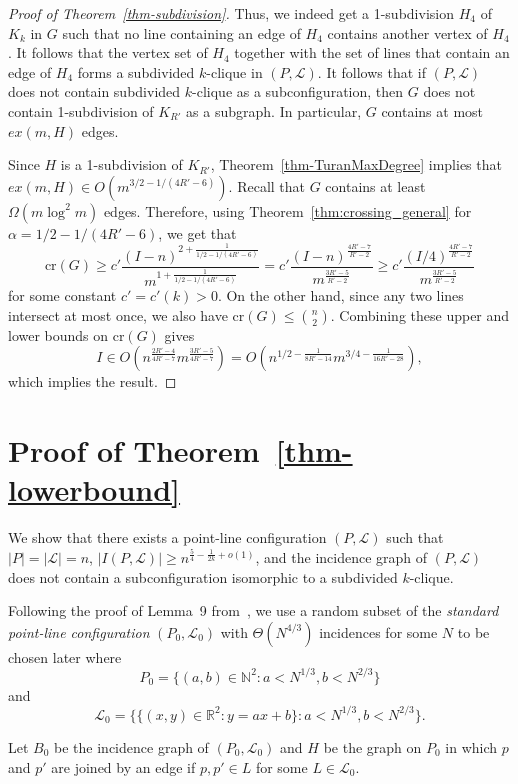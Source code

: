\documentclass{article}
\begin{document}
\begin{proof}[Proof of Theorem~\ref{thm-subdivision}]
Thus, we indeed get a 1-subdivision $H_4$ of $K_k$ in $G$ such that no line containing an edge of $H_4$ contains another vertex of $H_4$. 
It follows that the vertex set of $H_4$ together with the set of lines that contain an edge of $H_4$ forms a subdivided $k$-clique in $(P,\mathcal{L})$.
It follows that if $(P,\mathcal{L})$ does not contain subdivided $k$-clique as a subconfiguration, then $G$ does not contain 1-subdivision of $K_{R'}$ as a subgraph.
In particular, $G$ contains at most $ex(m,H)$ edges.

Since $H$ is a 1-subdivision of $K_{R'}$,  Theorem~\ref{thm-TuranMaxDegree} implies that $ex(m,H) \in O(m^{3/2-1/(4R'-6)})$.
Recall that $G$ contains at least $\Omega(m\log^2{m})$ edges.
Therefore, using Theorem~\ref{thm:crossing_general} for $\alpha = 1/2 - 1/(4R'-6)$, we get that 
\[\textrm{cr}(G)\geq c'\frac{(I-n)^{2+\frac{1}{1/2-1/(4R'-6)}}}{m^{1+\frac{1}{1/2-1/(4R'-6)}}} = c'\frac{(I-n)^{\frac{4R'-7}{R'-2}}}{m^{\frac{3R'-5}{R'-2}}} \geq c'\frac{(I/4)^{\frac{4R'-7}{R'-2}}}{m^{\frac{3R'-5}{R'-2}}}\]
for some constant $c'=c'(k)>0$.
On the other hand, since any two lines intersect at most once, we also have $\textrm{cr}(G)\leq \binom{n}{2}$.
Combining these upper and lower bounds on $\textrm{cr}(G)$ gives
\[I \in O\left(n^{\frac{2R'-4}{4R'-7}}m^{\frac{3R'-5}{4R'-7}}\right) = O\left(n^{1/2-\frac{1}{8R'-14}}m^{3/4-\frac{1}{16R'-28}}\right),\]
which implies the result.
\end{proof}


\section{Proof of Theorem~\ref{thm-lowerbound}}

We show that there exists a point-line configuration $(P,\mathcal{L})$ such that $|P|=|\mathcal{L}|=n$, $|I(P,\mathcal{L})|\geq n^{\frac{5}{4}-\frac{1}{2k}+o(1)}$, and the incidence graph of $(P,\mathcal{L})$ does not contain a subconfiguration isomorphic to a subdivided $k$-clique.

Following the proof of Lemma~9 from~\cite{tomSuk21}, we use a random subset of the \emph{standard point-line configuration} $(P_0, \mathcal{L}_0)$ with $\Theta(N^{4/3})$ incidences for some $N$ to be chosen later where
\[P_0 = \{(a,b) \in \mathbb{N}^2 \colon a < N^{1/3}, b<N^{2/3}\}\]
and
\[\mathcal{L}_0 = \{\{(x,y) \in \mathbb{R}^2 \colon y=ax+b\} \colon a < N^{1/3}, b<N^{2/3}\}.\]

Let $B_0$ be the incidence graph of $(P_0,\mathcal{L}_0)$ and $H$ be the graph on $P_0$ in which $p$ and $p'$ are joined by an edge if $p,p'\in L$ for some $L\in \mathcal{L}_0$.
\end{document}
